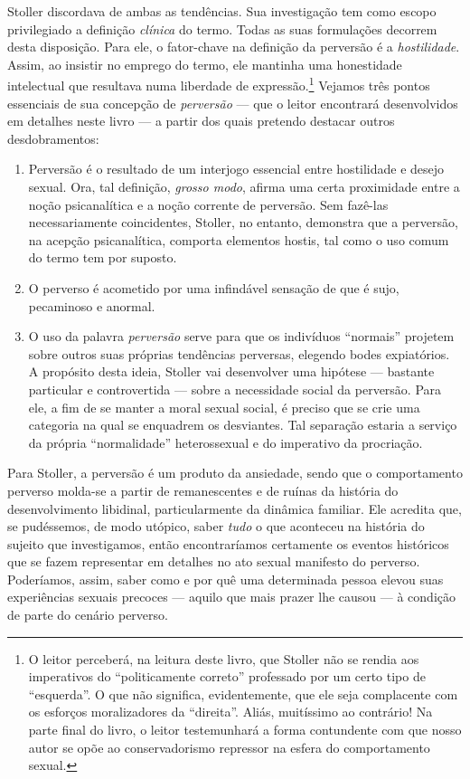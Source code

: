 Stoller discordava de ambas as tendências. Sua investigação tem como escopo
privilegiado a definição \textit{clínica} do termo. Todas as suas
formulações decorrem desta disposição. Para ele, o fator-chave na definição
da perversão é a \textit{hostilidade}. Assim, ao insistir no emprego do
termo, ele mantinha uma honestidade intelectual que resultava numa
liberdade de expressão.\footnote{ O leitor perceberá, na leitura deste
livro, que Stoller não se rendia aos imperativos do “politicamente correto”
professado por um certo tipo de “esquerda”. O que não significa,
evidentemente, que ele seja complacente com os esforços moralizadores da
“direita”. Aliás, muitíssimo ao contrário! Na parte final do livro, o
leitor testemunhará a forma contundente com que nosso autor se opõe ao
conservadorismo repressor na esfera do comportamento sexual.} Vejamos três
pontos essenciais de sua concepção de \textit{perversão} --- que o leitor
encontrará desenvolvidos em detalhes neste livro --- a partir dos quais
pretendo destacar outros desdobramentos:


\begin{enumerate}
\item Perversão é o resultado de um interjogo essencial entre hostilidade e
desejo sexual. Ora, tal definição, \textit{grosso modo}, afirma uma certa
proximidade entre a noção psicanalítica e a noção corrente de perversão.
Sem fazê-las necessariamente coincidentes, Stoller, no entanto, demonstra
que a perversão, na acepção psicanalítica, comporta elementos hostis, tal
como o uso comum do termo tem por suposto.

\item O perverso é acometido por uma infindável sensação de que é sujo,
pecaminoso e anormal.

\item O uso da palavra \textit{perversão} serve para que os indivíduos
“normais” projetem sobre outros suas próprias tendências perversas,
elegendo bodes expiatórios. A propósito desta ideia, Stoller vai
desenvolver uma hipótese --- bastante particular e controvertida --- sobre a
necessidade social da perversão. Para ele, a fim de se manter a moral
sexual social, é preciso que se crie uma categoria na qual se enquadrem os
desviantes. Tal separação estaria a serviço da própria “normalidade”
heterossexual e do imperativo da procriação.
\end{enumerate}

Para Stoller, a perversão é um produto da ansiedade, sendo que o
comportamento perverso molda-se a partir de remanescentes e de ruínas da
história do desenvolvimento libidinal, particularmente da dinâmica
familiar. Ele acredita que, se pudéssemos, de modo utópico, saber
\textit{tudo} o que aconteceu na história do sujeito que investigamos,
então encontraríamos certamente os eventos históricos que se fazem
representar em detalhes no ato sexual manifesto do perverso. Poderíamos,
assim, saber como e por quê uma determinada pessoa elevou suas experiências
sexuais precoces --- aquilo que mais prazer lhe causou --- à condição de parte
do cenário perverso.

